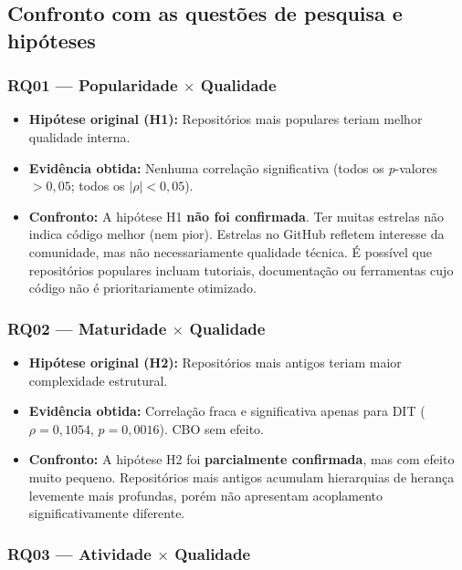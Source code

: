 \documentclass[12pt,a4paper]{article}
\begin{document}
\subsection{Confronto com as questões de pesquisa e hipóteses}

\subsubsection{RQ01 — Popularidade $\times$ Qualidade}

\begin{itemize}
    \item \textbf{Hipótese original (H1):} Repositórios mais populares teriam melhor qualidade interna.
    \item \textbf{Evidência obtida:} Nenhuma correlação significativa (todos os \textit{p}-valores $> 0{,}05$; todos os $|\rho| < 0{,}05$).
    \item \textbf{Confronto:} A hipótese H1 \textbf{não foi confirmada}. Ter muitas estrelas não indica código melhor (nem pior). Estrelas no GitHub refletem interesse da comunidade, mas não necessariamente qualidade técnica. É possível que repositórios populares incluam tutoriais, documentação ou ferramentas cujo código não é prioritariamente otimizado.
\end{itemize}

\subsubsection{RQ02 — Maturidade $\times$ Qualidade}

\begin{itemize}
    \item \textbf{Hipótese original (H2):} Repositórios mais antigos teriam maior complexidade estrutural.
    \item \textbf{Evidência obtida:} Correlação fraca e significativa apenas para DIT ($\rho = 0{,}1054$, $p = 0{,}0016$). CBO sem efeito.
    \item \textbf{Confronto:} A hipótese H2 foi \textbf{parcialmente confirmada}, mas com efeito muito pequeno. Repositórios mais antigos acumulam hierarquias de herança levemente mais profundas, porém não apresentam acoplamento significativamente diferente.
\end{itemize}

\subsubsection{RQ03 — Atividade $\times$ Qualidade}
\end{document}
